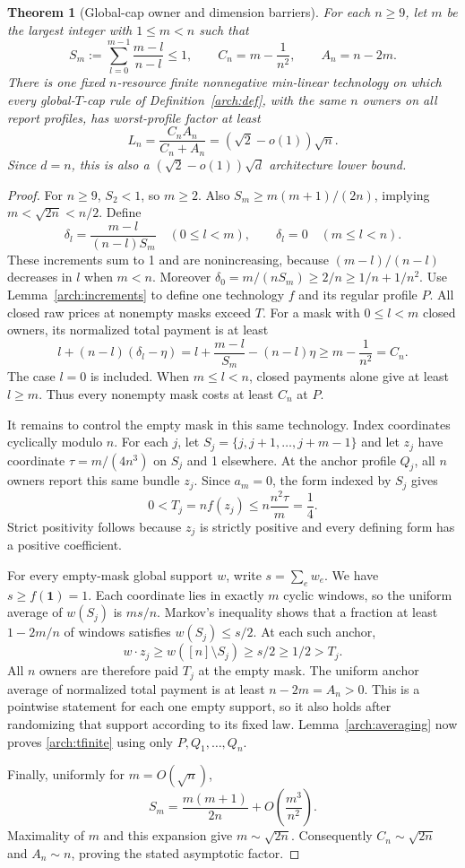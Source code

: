 \documentclass[11pt]{article}
\newtheorem{theorem}{Theorem}[section]
\theoremstyle{definition}\newtheorem{definition}[theorem]{Definition}
\theoremstyle{remark}\newtheorem{remark}[theorem]{Remark}
\begin{document}
\begin{theorem}[Global-cap owner and dimension barriers]
\label{arch:tbarrier}
For each $n\ge9$, let $m$ be the largest integer with $1\le m<n$ such that
\[
 S_m:=\sum_{l=0}^{m-1}\frac{m-l}{n-l}\le1,
 \qquad C_n=m-\frac1{n^2},\qquad A_n=n-2m.
\]
There is one fixed $n$-resource finite nonnegative min-linear technology on
which every global-$T$-cap rule of Definition~\ref{arch:def}, with the same
$n$ owners on all report profiles, has worst-profile factor at least
\begin{equation}\label{arch:tfinite}
 L_n=\frac{C_nA_n}{C_n+A_n}
      =(\sqrt2-o(1))\sqrt n.
\end{equation}
Since $d=n$, this is also a $(\sqrt2-o(1))\sqrt d$ architecture lower bound.
\end{theorem}
\begin{proof}
For $n\ge9$, $S_2<1$, so $m\ge2$. Also
$S_m\ge m(m+1)/(2n)$, implying $m<\sqrt{2n}<n/2$.
Define
\[
 \delta_l=\frac{m-l}{(n-l)S_m}\quad(0\le l<m),
 \qquad\delta_l=0\quad(m\le l<n).
\]
These increments sum to 1 and are nonincreasing, because
$(m-l)/(n-l)$ decreases in $l$ when $m<n$. Moreover
$\delta_0=m/(nS_m)\ge2/n\ge1/n+1/n^2$.
Use Lemma~\ref{arch:increments} to define one technology $f$ and its
regular profile $P$. All closed raw prices at nonempty masks exceed $T$.
For a mask with $0\le l<m$ closed owners, its normalized total payment is
at least
\[
 l+(n-l)(\delta_l-\eta)
 =l+\frac{m-l}{S_m}-(n-l)\eta
 \ge m-\frac1{n^2}=C_n.
\]
The case $l=0$ is included. When $m\le l<n$, closed payments alone give
at least $l\ge m$. Thus every nonempty mask costs at least $C_n$ at $P$.

It remains to control the empty mask in this same technology. Index
coordinates cyclically modulo $n$. For each $j$, let
$S_j=\{j,j+1,\ldots,j+m-1\}$ and let $z_j$ have coordinate
$\tau=m/(4n^3)$ on $S_j$ and 1 elsewhere. At the anchor profile $Q_j$, all
$n$ owners report this same bundle $z_j$. Since $a_m=0$, the form indexed
by $S_j$ gives
\[
 0<T_j=nf(z_j)\le n\frac{n^2\tau}{m}=\frac14.
\]
Strict positivity follows because $z_j$ is strictly positive and every
defining form has a positive coefficient.

For every empty-mask global support $w$, write $s=\sum_e w_e$.
We have $s\ge f(\mathbf1)=1$. Each coordinate lies in exactly $m$ cyclic
windows, so the uniform average of $w(S_j)$ is $ms/n$. Markov's inequality
shows that a fraction at least $1-2m/n$ of windows satisfies
$w(S_j)\le s/2$. At each such anchor,
\[
 w\cdot z_j\ge w([n]\setminus S_j)\ge s/2\ge1/2>T_j.
\]
All $n$ owners are therefore paid $T_j$ at the empty mask. The uniform
anchor average of normalized total payment is at least $n-2m=A_n>0$.
This is a pointwise statement for each one empty support, so it also holds
after randomizing that support according to its fixed law.
Lemma~\ref{arch:averaging} now proves \eqref{arch:tfinite} using only
$P,Q_1,\ldots,Q_n$.

Finally, uniformly for $m=O(\sqrt n)$,
\[
 S_m=\frac{m(m+1)}{2n}+O\left(\frac{m^3}{n^2}\right).
\]
Maximality of $m$ and this expansion give $m\sim\sqrt{2n}$.
Consequently $C_n\sim\sqrt{2n}$ and $A_n\sim n$, proving the stated
asymptotic factor.
\end{proof}
\end{document}
